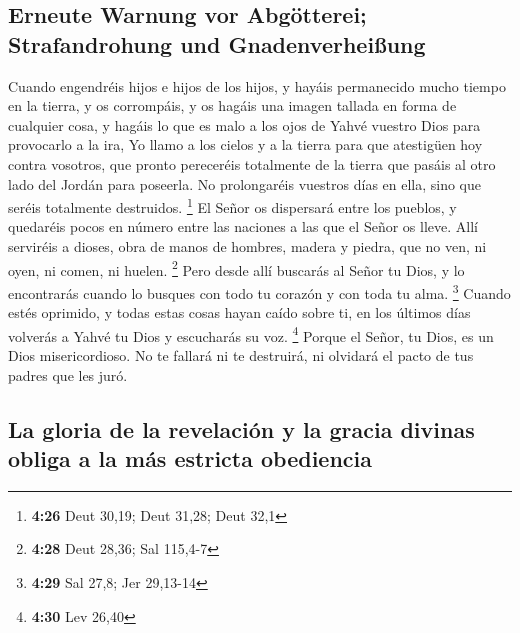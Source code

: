\begin{paracol}{2}
\hypertarget{erneute-warnung-vor-abguxf6tterei-strafandrohung-und-gnadenverheiuxdfung}{%
\subsection{Erneute Warnung vor Abgötterei; Strafandrohung und
Gnadenverheißung}\label{erneute-warnung-vor-abguxf6tterei-strafandrohung-und-gnadenverheiuxdfung}}

 Cuando engendréis hijos e hijos de los hijos, y hayáis
permanecido mucho tiempo en la tierra, y os corrompáis, y os hagáis una
imagen tallada en forma de cualquier cosa, y hagáis lo que es malo a los
ojos de Yahvé vuestro Dios para provocarlo a la ira,  Yo
llamo a los cielos y a la tierra para que atestigüen hoy contra
vosotros, que pronto pereceréis totalmente de la tierra que pasáis al
otro lado del Jordán para poseerla. No prolongaréis vuestros días en
ella, sino que seréis totalmente destruidos. \footnote{\textbf{4:26}
  Deut 30,19; Deut 31,28; Deut 32,1}  El Señor os
dispersará entre los pueblos, y quedaréis pocos en número entre las
naciones a las que el Señor os lleve.  Allí serviréis a
dioses, obra de manos de hombres, madera y piedra, que no ven, ni oyen,
ni comen, ni huelen. \footnote{\textbf{4:28} Deut 28,36; Sal 115,4-7}
 Pero desde allí buscarás al Señor tu Dios, y lo
encontrarás cuando lo busques con todo tu corazón y con toda tu alma.
\footnote{\textbf{4:29} Sal 27,8; Jer 29,13-14}  Cuando
estés oprimido, y todas estas cosas hayan caído sobre ti, en los últimos
días volverás a Yahvé tu Dios y escucharás su voz. \footnote{\textbf{4:30}
  Lev 26,40}  Porque el Señor, tu Dios, es un Dios
misericordioso. No te fallará ni te destruirá, ni olvidará el pacto de
tus padres que les juró.

\hypertarget{la-gloria-de-la-revelaciuxf3n-y-la-gracia-divinas-obliga-a-la-muxe1s-estricta-obediencia}{%
\subsection{La gloria de la revelación y la gracia divinas obliga a la
más estricta
obediencia}\label{la-gloria-de-la-revelaciuxf3n-y-la-gracia-divinas-obliga-a-la-muxe1s-estricta-obediencia}}


\end{paracol}

